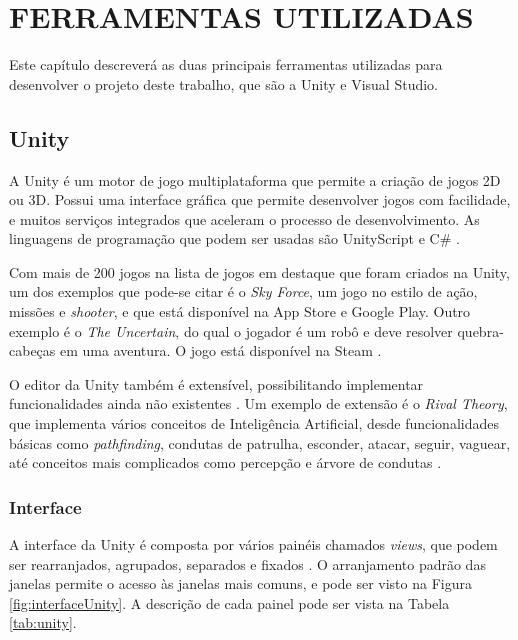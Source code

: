 \documentclass[
	12pt,					%
	openright,				%
	oneside,				%
	a4paper,				%
	bibjustif,				%
	chapter=TITLE,			%
	english,				%
	brazil,					%
	]{abntex2}
\begin{document}
\FloatBarrier
\newpage %
\chapter{FERRAMENTAS UTILIZADAS}

	Este capítulo descreverá as duas principais ferramentas utilizadas para desenvolver o projeto deste trabalho,
	que são a Unity e Visual Studio.

	\FloatBarrier
	\section{Unity}
		A Unity é um motor de jogo multiplataforma que permite a criação de jogos 2D ou 3D.
		Possui uma interface gráfica que permite desenvolver jogos com facilidade,
		e muitos serviços integrados que aceleram o processo de desenvolvimento.
		As linguagens de programação que podem ser usadas são UnityScript e C\#
		\cite{unitySite}.
		
		Com mais de 200 jogos na lista de jogos em destaque que foram criados na Unity,
		um dos exemplos que pode-se citar é o \textit{Sky Force},
		um jogo no estilo de ação, missões e \textit{shooter},
		e que está disponível na App Store e Google Play.
		Outro exemplo é o \textit{The Uncertain},
		do qual o jogador é um robô e
		deve resolver quebra-cabeças em uma aventura.
		O jogo está disponível na Steam
		\cite{unityGames}.
		
		O editor da Unity também é extensível, possibilitando implementar funcionalidades ainda não existentes
		\cite{unitySite}.
		Um exemplo de extensão é o \textit{Rival Theory},
		que implementa vários conceitos de Inteligência Artificial,
		desde funcionalidades básicas como \textit{pathfinding},
		condutas de patrulha, esconder, atacar, seguir, vaguear,
		até conceitos mais complicados como percepção e árvore de condutas
		\cite{rivalTheory}.
		
		\FloatBarrier
		\subsection{Interface}
			A interface da Unity é composta por vários painéis chamados \textit{views},
			que podem ser rearranjados, agrupados, separados e fixados
			\cite{unityInterface}.
			O arranjamento padrão das janelas permite o acesso às janelas mais comuns,
			e pode ser visto na Figura \ref{fig:interfaceUnity}.
			A descrição de cada painel pode ser vista na Tabela \ref{tab:unity}.
			
\end{document}
